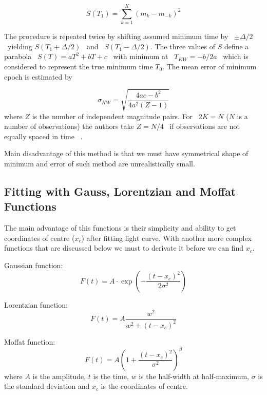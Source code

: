 \begin{equation} \label{eq:kwee_S}
S(T_{1}) = \sum_{k=1}^{K}(m_{k}-m_{-k})^2
\end{equation}

The procedure is repeated twice by shifting assumed minimum time by~ $\pm \Delta/2$ ~yielding $S(T_{1}+\Delta/2)$ ~and~ $S(T_{1}-\Delta/2)$.
The three values of $S$ define a parabola~ $S(T)=aT^2+bT+c$ ~with minimum at~ $T_{KW}=-b/2a$ ~which is considered to represent the 
true minimum time $T_{0}$. The mean error of minimum epoch is estimated by

\begin{equation} \label{eq:kwee_err}
\sigma_{KW} =\sqrt{\frac{4ac-b^2}{4a^2(Z-1)}} 
\end{equation}
where $Z$ is the number of independent magnitude pairs. For~ $2K=N$  ($N$ is a number of observations) the authors take  $Z=N/4$ ~if observations are not equally spaced in time ~\citep{kwee1956, brainhorst1973}.

Main disadvantage of this method is that we must have symmetrical shape of minimum and error of such method are unrealistically small. 


\subsection{Fitting with Gauss, Lorentzian and Moffat Functions}
The main advantage of this functions is their simplicity and ability to get coordinates of centre ($x_{c}$) after fitting light curve.
With another more complex functions that are discussed below we must to derivate it before we can find $x_{c}$.

Gaussian function:
\begin{equation}\label{eq:gaus}
F(t)= A\cdot \exp(-\frac{(t - x_{c})^2}{2\sigma^2})
\end{equation}

Lorentzian function: 
\begin{equation}\label{eq:lorentz}
F(t)= A \frac{w^2}{w^2 + (t - x_{c})^2}
\end{equation}

Moffat function: 
\begin{equation}\label{eq:moffat}
F(t)=  A \left( 1 + \frac{(t - x_c)^2}{\sigma^2} \right)^\beta      %
\end{equation}
where $A$ is the amplitude, $t$ is the time, $w$ is the half-width at half-maximum, $\sigma$ is the standard deviation and $x_{c}$ is the coordinates of centre. 

